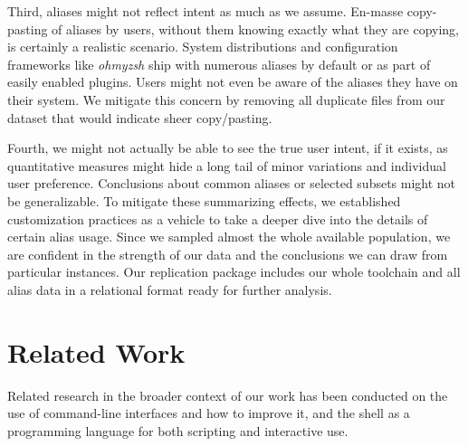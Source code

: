 \documentclass[smallextended,natbib]{svjour3}
\begin{document}
Third, aliases might not reflect intent as much as we assume.
En-masse copy-pasting of aliases by users, without them knowing exactly what they are copying, is certainly a realistic scenario.
System distributions and configuration frameworks like \emph{ohmyzsh} ship with numerous aliases by default or as part of easily enabled plugins.
Users might not even be aware of the aliases they have on their system.
We mitigate this concern by removing all duplicate files from our dataset that would indicate sheer copy/pasting.

Fourth, we might not actually be able to see the true user intent, if it exists, as quantitative measures might hide a long tail of minor variations and individual user preference.
Conclusions about common aliases or selected subsets might not be generalizable.
To mitigate these summarizing effects, we established customization practices as a vehicle to take a deeper dive into the details of certain alias usage.
Since we sampled almost the whole available population, we are confident in the strength of our data and the conclusions we can draw from particular instances.
Our replication package includes our whole toolchain and all alias data in a relational format ready for further analysis.

\section{Related Work}

Related research in the broader context of our work has been conducted on the use of command-line interfaces and how to improve it, and the shell as a programming language for both scripting and interactive use. 
\end{document}
